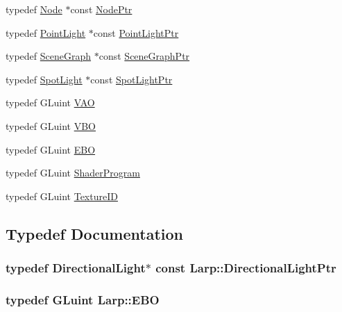 \begin{DoxyCompactItemize}
\item 
typedef \hyperlink{classLarp_1_1Node}{Node} $\ast$const \hyperlink{namespaceLarp_a171c1dc8b70cfb441b15d7386780db23}{Node\+Ptr}
\item 
typedef \hyperlink{structLarp_1_1PointLight}{Point\+Light} $\ast$const \hyperlink{namespaceLarp_a07215808e8e3c5229ca8549c5450e3e5}{Point\+Light\+Ptr}
\item 
typedef \hyperlink{classLarp_1_1SceneGraph}{Scene\+Graph} $\ast$const \hyperlink{namespaceLarp_acf02d81e4b52238dcd17cb6249eadadc}{Scene\+Graph\+Ptr}
\item 
typedef \hyperlink{structLarp_1_1SpotLight}{Spot\+Light} $\ast$const \hyperlink{namespaceLarp_a5366be98946441fcea9b8a155bc52d95}{Spot\+Light\+Ptr}
\item 
typedef G\+Luint \hyperlink{namespaceLarp_a459edfbf6a0def594cfeb6ecaa5d702e}{V\+AO}
\item 
typedef G\+Luint \hyperlink{namespaceLarp_ac6c5fe9357b92190f95c04109eb8c4f1}{V\+BO}
\item 
typedef G\+Luint \hyperlink{namespaceLarp_ade08f6d3b342a72949ce18e017840030}{E\+BO}
\item 
typedef G\+Luint \hyperlink{namespaceLarp_a9b24f5785486fc97891b6c8148d80953}{Shader\+Program}
\item 
typedef G\+Luint \hyperlink{namespaceLarp_a74839f089efb43154cba04bae031c942}{Texture\+ID}
\end{DoxyCompactItemize}


\subsection{Typedef Documentation}
\subsubsection[{\texorpdfstring{Directional\+Light\+Ptr}{DirectionalLightPtr}}]{\setlength{\rightskip}{0pt plus 5cm}typedef {\bf Directional\+Light}$\ast$ const {\bf Larp\+::\+Directional\+Light\+Ptr}}\hypertarget{namespaceLarp_a38725e08be7b2ebb94f5f71eb0f0c692}{}\label{namespaceLarp_a38725e08be7b2ebb94f5f71eb0f0c692}
\subsubsection[{\texorpdfstring{E\+BO}{EBO}}]{\setlength{\rightskip}{0pt plus 5cm}typedef G\+Luint {\bf Larp\+::\+E\+BO}}\hypertarget{namespaceLarp_ade08f6d3b342a72949ce18e017840030}{}\label{namespaceLarp_ade08f6d3b342a72949ce18e017840030}
